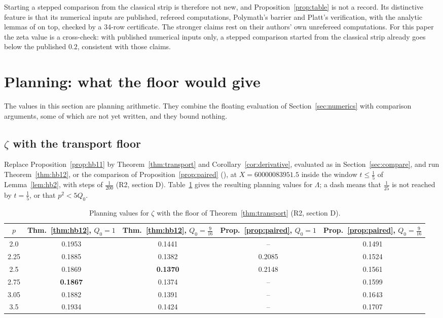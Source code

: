 \documentclass[11pt]{article}
\theoremstyle{definition}
\theoremstyle{remark}
\numberwithin{equation}{section}
\begin{document}
Starting a stepped comparison from the classical strip is therefore not new,
and Proposition~\ref{prop:table} is not a record. Its distinctive feature
is that its numerical inputs are published, refereed computations,
Polymath's barrier and Platt's verification, with the
analytic lemmas of \cite{hb} on top, checked by a 34-row certificate. The
stronger claims rest on their authors' own unrefereed computations. For
this paper the zeta value is a cross-check: with published numerical inputs
only, a stepped comparison started from the classical strip already goes
below the published $0.2$, consistent with those claims.

\section{Planning: what the floor would give}\label{sec:planning}

The values in this section are planning arithmetic. They combine the
floating evaluation of Section~\ref{sec:numerics} with comparison
arguments, some of which are not yet written, and they bound nothing.

\subsection{\texorpdfstring{$\zeta$}{Zeta} with the transport floor}

Replace Proposition~\ref{prop:hb11} by Theorem~\ref{thm:transport} and
Corollary~\ref{cor:derivative}, evaluated as in Section~\ref{sec:compare},
and run Theorem~\ref{thm:hb12}, or the comparison of
Proposition~\ref{prop:paired} (\cite[Theorem~9]{hb}), at
$X=60000083951.5$ inside the window $t\le\frac15$ of Lemma~\ref{lem:hb2},
with steps of $\frac1{200}$ (R2, section D). Table~\ref{tab:zetaplan}
gives the resulting planning values for $\Lambda$; a dash means that
$\frac1{25}$ is not reached by $t=\frac15$, or that $p^2<5Q_0$.

\begin{table}[ht]
\centering\small
\begin{tabular}{@{}ccccc@{}}
\toprule
$p$ & Thm.~\ref{thm:hb12}, $Q_0=1$ & Thm.~\ref{thm:hb12}, $Q_0=\frac9{16}$ & Prop.~\ref{prop:paired}, $Q_0=1$ & Prop.~\ref{prop:paired}, $Q_0=\frac9{16}$\\
\midrule
2.0 & 0.1953 & 0.1441 & -- & 0.1491\\
2.25 & 0.1885 & 0.1382 & 0.2085 & 0.1524\\
2.5 & 0.1869 & \textbf{0.1370} & 0.2148 & 0.1561\\
2.75 & \textbf{0.1867} & 0.1374 & -- & 0.1599\\
3.05 & 0.1882 & 0.1391 & -- & 0.1643\\
3.5 & 0.1934 & 0.1424 & -- & 0.1707\\
\bottomrule
\end{tabular}
\caption{Planning values for $\zeta$ with the floor of Theorem~\ref{thm:transport} (R2, section D).}\label{tab:zetaplan}
\end{table}
\end{document}
